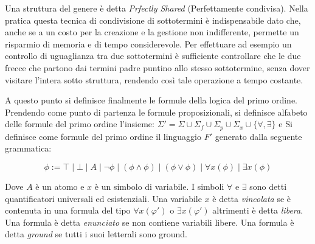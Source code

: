 \documentclass[./main.tex]{subfiles}
\begin{document}
\begin{center}
\end{center}

Una struttura del genere è detta \textit{Prfectly Shared} (Perfettamente condivisa). Nella pratica questa
tecnica di condivisione di sottotermini è indispensabile dato che,
anche se a un costo per la creazione e la gestione non indifferente,
permette un risparmio di memoria e di tempo considerevole. Per effettuare ad esempio un controllo 
di uguaglianza tra due sottotermini è sufficiente controllare che le due frecce che partono dai termini padre
puntino allo stesso sottotermine, senza dover visitare l'intera sotto struttura, rendendo così tale operazione a tempo costante.


A questo punto si definisce finalmente le formule della logica del primo ordine. Prendendo come punto di partenza le formule proposizionali,
si definisce alfabeto delle formule del primo ordine l'insieme: 
$\Sigma' = \Sigma \cup \Sigma_f \cup \Sigma_p \cup \Sigma_x \cup \{\forall, \exists\}$ 
e Si definisce come formule del primo ordine il linguaggio $F'$ generato dalla seguente grammatica:

$$ \phi := \top \mid \bot \mid A \mid \lnot \phi \mid (\phi \land \phi) \mid (\phi \lor \phi) \mid \forall x (\phi) \mid \exists x (\phi) $$

Dove $A$ è un atomo e $x$ è un simbolo di variabile. I simboli $\forall$ e $\exists$ sono detti quantificatori universali ed esistenziali.
Una variabile $x$ è detta \textit{vincolata} se è contenuta in una formula del tipo $\forall x (\varphi')$ o $\exists x (\varphi')$ 
altrimenti è detta \textit{libera}. Una formula è detta \textit{enunciato} se non contiene variabili libere. Una formula è detta 
\textit{ground} se tutti i suoi letterali sono ground.
\end{document}
